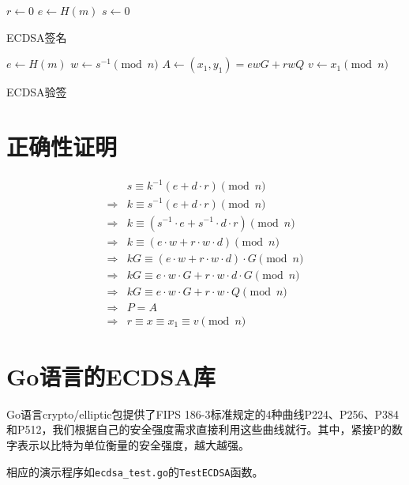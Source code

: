 \documentclass[a4paper,10pt]{article}
\begin{document}
\begin{adjustbox}{left=0.45\linewidth,minipage=0.45\linewidth,valign=T}
  \begin{algorithm}[H]
    \DontPrintSemicolon

    \BlankLine

    \(r\leftarrow 0\)\;
    \(e\leftarrow H(m)\)\;
    \(s\leftarrow 0\)\;

    \caption{ECDSA签名}\label{algo-sign}
  \end{algorithm}
\end{adjustbox}  
\begin{adjustbox}{left=0.45\linewidth,minipage=0.45\linewidth,valign=T}
  \begin{algorithm}[H]
    \DontPrintSemicolon

    \BlankLine

    \(e\leftarrow H(m)\)\;
    \(w\leftarrow s^{-1}\pmod{n}\)\;
    \(A\leftarrow (x_1,y_1)=ewG+rwQ\)\;
    \(v\leftarrow x_1\pmod{n}\)\;

    \caption{ECDSA验签}\label{algo-verify}
  \end{algorithm}
\end{adjustbox}  

\section{正确性证明}
\[
  \begin{aligned}  
    &s \equiv k^{-1}(e+d\cdot r)\pmod{n} \\
    \Rightarrow &k \equiv s^{-1}(e+d\cdot r)\pmod{n} \\
    \Rightarrow &k \equiv (s^{-1}\cdot e+s^{-1}\cdot d\cdot r)\pmod{n} \\
    \Rightarrow &k \equiv (e\cdot w+r\cdot w\cdot d)\pmod{n} \\
    \Rightarrow &kG \equiv (e\cdot w+r\cdot w\cdot d)\cdot G\pmod{n} \\
    \Rightarrow &kG \equiv e\cdot w\cdot G +r\cdot w\cdot d\cdot G \pmod{n} \\
    \Rightarrow &kG \equiv e\cdot w\cdot G +r\cdot w\cdot Q \pmod{n} \\
    \Rightarrow &P=A \\
    \Rightarrow &r\equiv x\equiv x_1\equiv v\pmod{n}
  \end{aligned}  
\]

\section{Go语言的ECDSA库}
Go语言crypto/elliptic包提供了FIPS 186-3标准规定的4种曲线P224、P256、P384和P512，我们根据自己的安全强度需求直接利用这些曲线就行。其中，紧接P的数字表示以比特为单位衡量的安全强度，越大越强。

相应的演示程序如\lstinline!ecdsa_test.go!的\lstinline!TestECDSA!函数。
\end{document}
